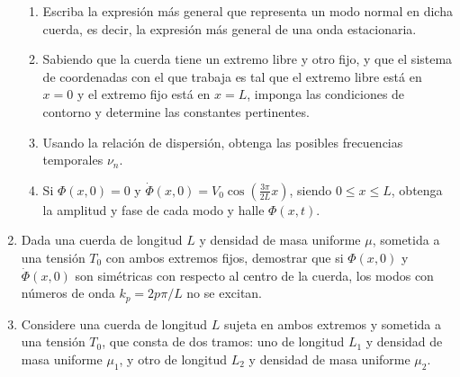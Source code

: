 \documentclass[11pt,spanish,a4paper]{article}
\begin{document}
\begin{enumerate}
\begin{enumerate}
\item Escriba la expresión más general que representa un modo normal en
dicha cuerda, es decir, la expresión más general de una onda estacionaria.
\item Sabiendo que la cuerda tiene un extremo libre y otro fijo, y que el
sistema de coordenadas con el que trabaja es tal que el extremo libre
está en $x=0$ y el extremo fijo está en $x=L$, imponga las condiciones
de contorno y determine las constantes pertinentes.
\item Usando la relación de dispersión, obtenga las posibles frecuencias
temporales $\nu_{n}$. 
\item Si $\Phi(x,0)=0$ y $\dot{\Phi}(x,0)=V_{0}\cos\left(\frac{3\pi}{2L}x\right)$,
siendo $0\le x\le L$, obtenga la amplitud y fase de cada modo y halle
$\Phi(x,t)$.
\end{enumerate}
\item Dada una cuerda de longitud $L$ y densidad de masa uniforme $\mu$,
sometida a una tensión $T_{0}$ con ambos extremos fijos, demostrar
que si $\Phi(x,0)$ y $\dot{\Phi}(x,0)$ son simétricas con respecto
al centro de la cuerda, los modos con números de onda $k_{p}=2p\pi/L$
no se excitan.
\item Considere una cuerda de longitud $L$ sujeta en ambos extremos y sometida
a una tensión $T_{0}$, que consta de dos tramos: uno de longitud
$L_{1}$ y densidad de masa uniforme $\mu_{1}$, y otro de longitud
$L_{2}$ y densidad de masa uniforme $\mu_{2}$.


\end{enumerate}
\end{document}
